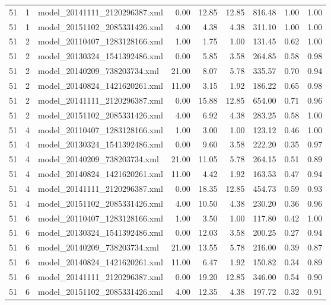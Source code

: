 \begin{table}[ht]
\begin{tabular}{rrlrrrrrr}
   51 &   1 & model\_20141111\_2120296387.xml & 0.00 & 12.85 & 12.85 & 816.48 & 1.00 & 1.00 \\ 
   51 &   1 & model\_20151102\_2085331426.xml & 4.00 & 4.38 & 4.38 & 311.10 & 1.00 & 1.00 \\ 
   51 &   2 & model\_20110407\_1283128166.xml & 1.00 & 1.75 & 1.00 & 131.45 & 0.62 & 1.00 \\ 
   51 &   2 & model\_20130324\_1541392486.xml & 0.00 & 5.85 & 3.58 & 264.85 & 0.58 & 0.98 \\ 
   51 &   2 & model\_20140209\_738203734.xml & 21.00 & 8.07 & 5.78 & 335.57 & 0.70 & 0.94 \\ 
   51 &   2 & model\_20140824\_1421620261.xml & 11.00 & 3.15 & 1.92 & 186.22 & 0.65 & 0.98 \\ 
   51 &   2 & model\_20141111\_2120296387.xml & 0.00 & 15.88 & 12.85 & 654.00 & 0.71 & 0.96 \\ 
   51 &   2 & model\_20151102\_2085331426.xml & 4.00 & 6.92 & 4.38 & 283.25 & 0.58 & 1.00 \\ 
   51 &   4 & model\_20110407\_1283128166.xml & 1.00 & 3.00 & 1.00 & 123.12 & 0.46 & 1.00 \\ 
   51 &   4 & model\_20130324\_1541392486.xml & 0.00 & 9.60 & 3.58 & 222.20 & 0.35 & 0.97 \\ 
   51 &   4 & model\_20140209\_738203734.xml & 21.00 & 11.05 & 5.78 & 264.15 & 0.51 & 0.89 \\ 
   51 &   4 & model\_20140824\_1421620261.xml & 11.00 & 4.42 & 1.92 & 163.53 & 0.47 & 0.94 \\ 
   51 &   4 & model\_20141111\_2120296387.xml & 0.00 & 18.35 & 12.85 & 454.73 & 0.59 & 0.93 \\ 
   51 &   4 & model\_20151102\_2085331426.xml & 4.00 & 10.50 & 4.38 & 230.20 & 0.36 & 0.96 \\ 
   51 &   6 & model\_20110407\_1283128166.xml & 1.00 & 3.50 & 1.00 & 117.80 & 0.42 & 1.00 \\ 
   51 &   6 & model\_20130324\_1541392486.xml & 0.00 & 12.03 & 3.58 & 200.25 & 0.27 & 0.94 \\ 
   51 &   6 & model\_20140209\_738203734.xml & 21.00 & 13.55 & 5.78 & 216.00 & 0.39 & 0.87 \\ 
   51 &   6 & model\_20140824\_1421620261.xml & 11.00 & 6.47 & 1.92 & 150.82 & 0.34 & 0.89 \\ 
   51 &   6 & model\_20141111\_2120296387.xml & 0.00 & 19.20 & 12.85 & 346.00 & 0.54 & 0.90 \\ 
   51 &   6 & model\_20151102\_2085331426.xml & 4.00 & 12.35 & 4.38 & 197.72 & 0.32 & 0.91 \\ 

\end{tabular}
\end{table}
